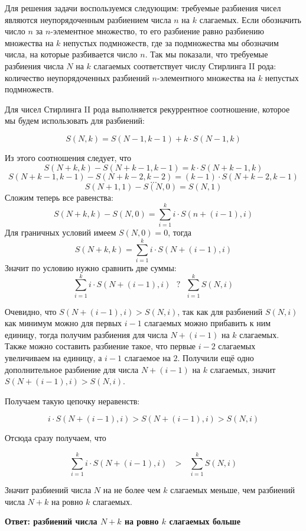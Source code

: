 \documentclass[a4paper,12pt]{article} %
\begin{document}
Для решения задачи воспользуемся следующим: требуемые разбиения чисел являются неупорядоченным разбиением числа $n$ на $k$ слагаемых. Если обозначить число $n$ за $n$-элементное множество, то его разбиение равно разбиению множества на $k$ непустых подмножеств, где за подмножества мы обозначим числа, на которые разбивается число $n$. Так мы показали, что требуемые разбиения числа $N$ на $k$ слагаемых соответствует числу Стирлинга II рода: количество неупорядоченных разбиений $n$-элементного множества на $k$ непустых подмножеств.

Для чисел Стирлинга II рода выполняется рекуррентное соотношение, которое мы будем использовать для разбиений:

\[S(N,k) = S(N-1,k-1) + k\cdot S(N-1,k)\]

Из этого соотношения следует, что
  \[S(N + k,k) - S(N+k-1,k-1) = k\cdot S(N+k-1,k)\]
  \[S(N + k-1,k-1) - S(N+k-2,k-2) = (k-1) \cdot S(N+k-2,k-1)\]
  \[...\]
  \[S(N + 1,1) - S(N,0) = S(N,1)\]
Сложим теперь все равенства:
\[S(N + k,k) - S(N,0) = \sum_{i=1}^k i \cdot S(n+(i-1), i)\]
Для граничных условий имеем $S(N,0) = 0$, тогда
\[S(N + k,k) = \sum_{i=1}^k i \cdot S(N+(i-1), i)\]
Значит по условию нужно сравнить две суммы:
\[\sum_{i=1}^k i \cdot S(N+(i-1), i) \text{ }?\text{ } \sum_{i=1}^k S(N,i)\]

Очевидно, что $S(N+(i-1), i) > S(N, i)$, так как для разбиений $S(N, i)$ как минимум можно для первых $i-1$ слагаемых можно прибавить к ним единицу, тогда получим разбиения для числа $N+(i-1)$ на $k$ слагаемых. Также можно составить разбиение такое, что первые $i-2$ слагаемых увеличиваем на единицу, а $i-1$ слагаемое на $2$. Получили ещё одно дополнительное разбиение для числа $N+(i-1)$ на $k$ слагаемых, значит $S(N+(i-1), i) > S(N, i)$. 

Получаем такую цепочку неравенств:

\[i \cdot S(N+(i-1), i) > S(N+(i-1), i) > S(N, i)\]

Отсюда сразу получаем, что

\[\sum_{i=1}^k i \cdot S(N+(i-1), i) \text{ }>\text{ } \sum_{i=1}^k S(N,i)\]

Значит разбиений числа $N$ на не более
чем $k$ слагаемых меньше, чем разбиений числа $N + k$ на ровно $k$ слагаемых.\\


\begin{flushright}
\begin{large}
\textbf {Ответ: разбиений числа $N + k$ на ровно $k$ слагаемых больше}
\end{large}
\end{flushright}
\end{document}
